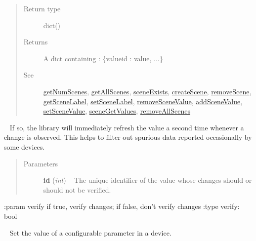\documentclass[letterpaper,10pt,english]{sphinxmanual}
\begin{document}
\begin{fulllineitems}
\begin{fulllineitems}
\begin{quote}
\begin{description}
\item[{Return type}] \leavevmode
dict()

\item[{Returns}] \leavevmode
A dict containing : \{valueid : value, ...\}

\item[{See}] \leavevmode
{\hyperref[libopenzwave:getnumscenes]{getNumScenes}}, {\hyperref[libopenzwave:getallscenes]{getAllScenes}}, {\hyperref[libopenzwave:sceneexists]{sceneExists}}, {\hyperref[libopenzwave:createscene]{createScene}}, {\hyperref[libopenzwave:removescene]{removeScene}}, {\hyperref[libopenzwave:getscenelabel]{getSceneLabel}}, {\hyperref[libopenzwave:setscenelabel]{setSceneLabel}}, {\hyperref[libopenzwave:removescenevalue]{removeSceneValue}}, {\hyperref[libopenzwave:addscenevalue]{addSceneValue}}, {\hyperref[libopenzwave:setscenevalue]{setSceneValue}}, {\hyperref[libopenzwave:scenegetvalues]{sceneGetValues}}, {\hyperref[libopenzwave:removeallscenes]{removeAllScenes}}

\end{description}\end{quote}

\end{fulllineitems}


\begin{fulllineitems}
\label{libopenzwave:libopenzwave.PyManager.setChangeVerified}~
If so, the library will immediately refresh the value a second time whenever a change is observed. This helps to filter out spurious data reported occasionally by some devices.
\begin{quote}\begin{description}
\item[{Parameters}] \leavevmode
\textbf{id} (\emph{int}) -- The unique identifier of the value whose changes should or should not be verified.

\end{description}\end{quote}

:param verify if true, verify changes; if false, don't verify changes
:type verify: bool

\end{fulllineitems}


\begin{fulllineitems}
\label{libopenzwave:libopenzwave.PyManager.setConfigParam}~\label{libopenzwave:setconfigparam}
Set the value of a configurable parameter in a device.


\end{fulllineitems}
\end{fulllineitems}
\end{document}
